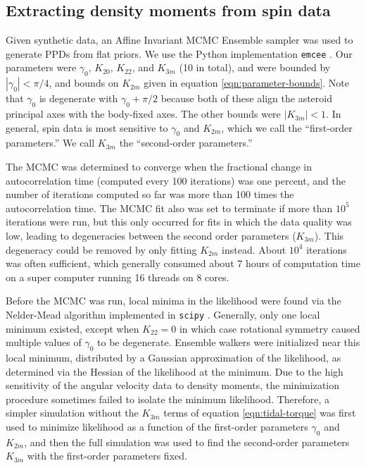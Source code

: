 \documentclass[fleqn,usenatbib]{mnras}
\begin{document}
\subsection{Extracting density moments from spin data}
\label{sec:fit}
Given synthetic data, an Affine Invariant MCMC Ensemble sampler was used to generate PPDs from flat priors. We use the Python implementation \texttt{emcee} \cite{foreman2013emcee}. Our parameters were $\gamma_0$, $K_{20}$, $K_{22}$, and $K_{3m}$ (10 in total), and were bounded by $|\gamma_0| < \pi/4$, and bounds on $K_{2 m}$ given in equation \ref{eqn:parameter-bounds}. Note that $\gamma_0$ is degenerate with $\gamma_0 + \pi/2$ because both of these align the asteroid principal axes with the body-fixed axes. The other bounds were $|K_{3m}| < 1$. In general, spin data is most sensitive to $\gamma_0$ and $K_{2m}$, which we call the ``first-order parameters.'' We call $K_{3m}$ the ``second-order parameters.''

The MCMC was determined to converge when the fractional change in autocorrelation time (computed every 100 iterations) was one percent, and the number of iterations computed so far was more than 100 times the autocorrelation time. The MCMC fit also was set to terminate if more than $10^5$ iterations were run, but this only occurred for fits in which the data quality was low, leading to degeneracies between the second order parameters ($K_{3 m}$). This degeneracy could be removed by only fitting $K_{2m}$ instead. About $10^4$ iterations was often sufficient, which generally consumed about 7 hours of computation time on a super computer running 16 threads on 8 cores.

Before the MCMC was run, local minima in the likelihood were found via the Nelder-Mead algorithm implemented in \texttt{scipy} \cite{Gao2012}. Generally, only one local minimum existed, except when $K_{22}=0$ in which case rotational symmetry caused multiple values of $\gamma_0$ to be degenerate. Ensemble walkers were initialized near this local minimum, distributed by a Gaussian approximation of the likelihood, as determined via the Hessian of the likelihood at the minimum. Due to the high sensitivity of the angular velocity data to density moments, the minimization procedure sometimes failed to isolate the minimum likelihood. Therefore, a simpler simulation without the $K_{3m}$ terms of equation \ref{eqn:tidal-torque} was first used to minimize likelihood as a function of the first-order parameters $\gamma_0$ and $K_{2m}$, and then the full simulation was used to find the second-order parameters $K_{3m}$ with the first-order parameters fixed.
\end{document}
